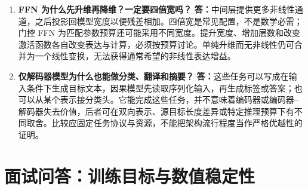 \documentclass[UTF8,12pt,a4paper,fontset=fandol]{ctexart}
\begin{document}
\begin{enumerate}[resume*=trquestions]
\item \textbf{FFN 为什么先升维再降维？一定要四倍宽吗？}
\textbf{答：}中间层提供更多非线性通道，之后投影回模型宽度以便残差相加。四倍宽是常见配置，不是数学必需；门控 FFN 为匹配参数预算还可能采用不同宽度。提升宽度、增加层数和改变激活函数各自改变表达与计算，必须按预算讨论。单纯升维而无非线性仍可合并为一个线性变换，无法获得通常希望的非线性表达增益。

\item \textbf{仅解码器模型为什么也能做分类、翻译和摘要？}
\textbf{答：}这些任务可以写成在输入条件下生成目标文本，因果模型先读取序列化输入，再生成标签或答案；也可以从某个表示接分类头。它能完成这些任务，并不意味着编码器或编码器--解码器失去价值，后者可在双向表示、源目标长度差异或特定推理预算下有不同取舍。比较应固定任务协议与资源，不能把架构流行程度当作严格优越性的证明。
\end{enumerate}

\section{面试问答：训练目标与数值稳定性}
\label{sec:tr-qa-training}
\end{document}
